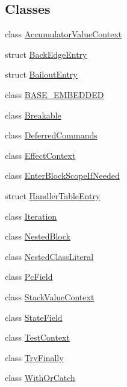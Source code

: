 \subsection*{Classes}
\begin{DoxyCompactItemize}
\item 
class \hyperlink{classv8_1_1internal_1_1_full_code_generator_1_1_accumulator_value_context}{Accumulator\+Value\+Context}
\item 
struct \hyperlink{structv8_1_1internal_1_1_full_code_generator_1_1_back_edge_entry}{Back\+Edge\+Entry}
\item 
struct \hyperlink{structv8_1_1internal_1_1_full_code_generator_1_1_bailout_entry}{Bailout\+Entry}
\item 
class \hyperlink{classv8_1_1internal_1_1_full_code_generator_1_1_b_a_s_e___e_m_b_e_d_d_e_d}{B\+A\+S\+E\+\_\+\+E\+M\+B\+E\+D\+D\+ED}
\item 
class \hyperlink{classv8_1_1internal_1_1_full_code_generator_1_1_breakable}{Breakable}
\item 
class \hyperlink{classv8_1_1internal_1_1_full_code_generator_1_1_deferred_commands}{Deferred\+Commands}
\item 
class \hyperlink{classv8_1_1internal_1_1_full_code_generator_1_1_effect_context}{Effect\+Context}
\item 
class \hyperlink{classv8_1_1internal_1_1_full_code_generator_1_1_enter_block_scope_if_needed}{Enter\+Block\+Scope\+If\+Needed}
\item 
struct \hyperlink{structv8_1_1internal_1_1_full_code_generator_1_1_handler_table_entry}{Handler\+Table\+Entry}
\item 
class \hyperlink{classv8_1_1internal_1_1_full_code_generator_1_1_iteration}{Iteration}
\item 
class \hyperlink{classv8_1_1internal_1_1_full_code_generator_1_1_nested_block}{Nested\+Block}
\item 
class \hyperlink{classv8_1_1internal_1_1_full_code_generator_1_1_nested_class_literal}{Nested\+Class\+Literal}
\item 
class \hyperlink{classv8_1_1internal_1_1_full_code_generator_1_1_pc_field}{Pc\+Field}
\item 
class \hyperlink{classv8_1_1internal_1_1_full_code_generator_1_1_stack_value_context}{Stack\+Value\+Context}
\item 
class \hyperlink{classv8_1_1internal_1_1_full_code_generator_1_1_state_field}{State\+Field}
\item 
class \hyperlink{classv8_1_1internal_1_1_full_code_generator_1_1_test_context}{Test\+Context}
\item 
class \hyperlink{classv8_1_1internal_1_1_full_code_generator_1_1_try_finally}{Try\+Finally}
\item 
class \hyperlink{classv8_1_1internal_1_1_full_code_generator_1_1_with_or_catch}{With\+Or\+Catch}
\end{DoxyCompactItemize}
